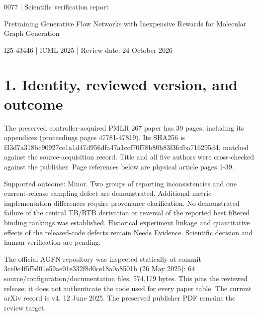 \documentclass[10pt]{article}
\begin{document}
0077 | Scientific verification report\par
Pretraining Generative Flow Networks with Inexpensive Rewards for Molecular Graph Generation\par
I25-43446 | ICML 2025 | Review date: 24 October 2026\par
\section*{1. Identity, reviewed version, and outcome}
The preserved controller-acquired PMLR 267 paper has 39 pages, including its appendices (proceedings pages 47781-47819). Its SHA256 is f33d7a318bc90927ce1a1d47d956dfa47a1ccf70f78b80b83f3fcfba716295d4, matched against the source-acquisition record. Title and all five authors were cross-checked against the publisher. Page references below are physical article pages 1-39.\par
Supported outcome: Minor. Two groups of reporting inconsistencies and one current-release sampling defect are demonstrated. Additional metric implementation differences require provenance clarification. No demonstrated failure of the central TB/RTB derivation or reversal of the reported best filtered binding rankings was established. Historical experiment linkage and quantitative effects of the released-code defects remain Needs Evidence. Scientific decision and human verification are pending.\par
The official AGFN repository was inspected statically at commit 3ce0c4f5f5d01e59ae01e332f8d0ce18a0a8501b (26 May 2025): 64 source/configuration/documentation files, 574,179 bytes. This pins the reviewed release; it does not authenticate the code used for every paper table. The current arXiv record is v4, 12 June 2025. The preserved publisher PDF remains the review target.\par
\end{document}
